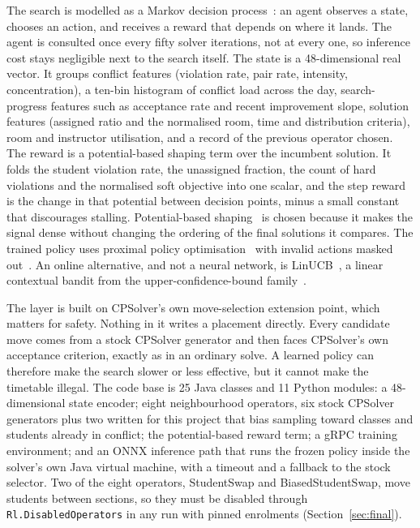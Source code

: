 \documentclass[journal]{IEEEtran}
\begin{document}
The search is modelled as a Markov decision process~\cite{sutton2018rl}: an agent observes a state, chooses an action, and receives a reward that depends on where it lands. The agent is consulted once every fifty solver iterations, not at every one, so inference cost stays negligible next to the search itself. The state is a 48-dimensional real vector. It groups conflict features (violation rate, pair rate, intensity, concentration), a ten-bin histogram of conflict load across the day, search-progress features such as acceptance rate and recent improvement slope, solution features (assigned ratio and the normalised room, time and distribution criteria), room and instructor utilisation, and a record of the previous operator chosen. The reward is a potential-based shaping term over the incumbent solution. It folds the student violation rate, the unassigned fraction, the count of hard violations and the normalised soft objective into one scalar, and the step reward is the change in that potential between decision points, minus a small constant that discourages stalling. Potential-based shaping~\cite{ng1999shaping} is chosen because it makes the signal dense without changing the ordering of the final solutions it compares. The trained policy uses proximal policy optimisation~\cite{schulman2017ppo} with invalid actions masked out~\cite{schulte2017maskable}. An online alternative, and not a neural network, is LinUCB~\cite{li2010linucb}, a linear contextual bandit from the upper-confidence-bound family~\cite{auer2002ucb}.

The layer is built on CPSolver's own move-selection extension point, which matters for safety. Nothing in it writes a placement directly. Every candidate move comes from a stock CPSolver generator and then faces CPSolver's own acceptance criterion, exactly as in an ordinary solve. A learned policy can therefore make the search slower or less effective, but it cannot make the timetable illegal. The code base is 25 Java classes and 11 Python modules: a 48-dimensional state encoder; eight neighbourhood operators, six stock CPSolver generators plus two written for this project that bias sampling toward classes and students already in conflict; the potential-based reward term; a gRPC training environment; and an ONNX inference path that runs the frozen policy inside the solver's own Java virtual machine, with a timeout and a fallback to the stock selector. Two of the eight operators, StudentSwap and BiasedStudentSwap, move students between sections, so they must be disabled through \texttt{Rl.DisabledOperators} in any run with pinned enrolments (Section~\ref{sec:final}).
\end{document}
